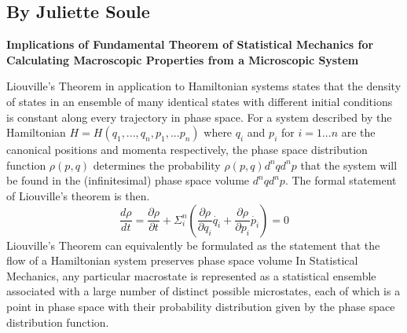 

\subsection{By Juliette Soule}
{\bf Implications of Fundamental Theorem of Statistical Mechanics for Calculating Macroscopic Properties from a Microscopic System}

Liouville's Theorem in application to Hamiltonian systems states that the density of states in an ensemble of many identical states with different initial conditions is constant along every trajectory in phase space. For a system described by the Hamiltonian $H = H(q_{1},...,q_{n},p_{1},...p_{n})$ where $q_{i}$ and $p_{i}$ for $i=1...n$ are the canonical positions and momenta respectively, the phase space distribution function $\rho(p,q)$ determines the probability $\rho(p,q)d^{n}qd^{n}p$ that the system will be found in the (infinitesimal) phase space volume $d^{n}qd^{n}p$. The formal statement of Liouville's theorem is then.
\begin{equation}
\frac{d\rho}{dt} = \frac{\partial\rho}{\partial t} + \Sigma_{i}^{n}(\frac{\partial\rho}{\partial q_{i}}\dot{q_{i}}+\frac{\partial\rho}{\partial p_{i}}\dot{p_{i}}) = 0
\end{equation}
Liouville's Theorem can equivalently be formulated as the statement that the flow of a Hamiltonian system preserves phase space volume
In Statistical Mechanics, any particular macrostate is represented as a statistical ensemble associated with a large number of distinct possible microstates, each of which is a point in phase space with their probability distribution given by the phase space distribution function. 
